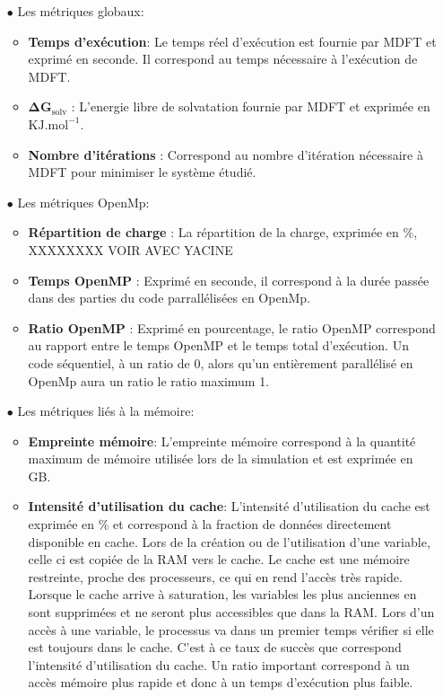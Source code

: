 \begin{itemize}
\item[$\bullet$] Les métriques globaux:
  \begin{itemize}
    \item \textbf{Temps d’exécution}: Le temps réel d'exécution est fournie par MDFT et exprimé en seconde. Il correspond au temps nécessaire à l'exécution de MDFT.
    \item $\mathbf{\Delta G_{\mathrm{solv}}}$ : L'energie libre de solvatation fournie par MDFT et exprimée en $\mathrm{KJ.mol}^{-1}$.
    \item \textbf{Nombre d'itérations} : Correspond au nombre d'itération nécessaire à MDFT pour minimiser le système étudié.
  \end{itemize}
  \vspace*{1.5ex}%

\item[$\bullet$] Les métriques OpenMp:
  \begin{itemize}
  \item \textbf{Répartition de charge} : La répartition de la charge, exprimée en \%, XXXXXXXX VOIR AVEC YACINE
  \item \textbf{Temps OpenMP} : Exprimé en seconde, il correspond à la durée passée dans des parties du code parrallélisées en OpenMp.
  \item \textbf{Ratio OpenMP} : Exprimé en pourcentage, le ratio OpenMP correspond au rapport entre le temps OpenMP et le temps total d'exécution. Un code séquentiel, à un ratio de 0, alors qu'un entièrement parallélisé en OpenMp aura un ratio le ratio maximum 1. 
  \end{itemize}
  \vspace*{1.5ex}%

\item[$\bullet$] Les métriques liés à la mémoire:
  \begin{itemize}
  \item \textbf{Empreinte mémoire}: L'empreinte mémoire correspond à la quantité maximum de mémoire utilisée lors de la simulation et est exprimée en GB.
  \item \textbf{Intensité d'utilisation du cache}: L'intensité d'utilisation du cache est exprimée en \% et correspond à la fraction de données directement disponible en cache. Lors de la création ou de l'utilisation d'une variable, celle ci est copiée de la RAM vers le cache. Le cache est une mémoire restreinte, proche des processeurs, ce qui en rend l'accès très rapide. Lorsque le cache arrive à saturation, les variables les plus anciennes en sont supprimées et ne seront plus accessibles que dans la RAM. Lors d'un accès à une variable, le processus va dans un premier temps vérifier si elle est toujours dans le cache. C'est à ce taux de succès que correspond l'intensité d'utilisation du cache. Un ratio important correspond à un accès mémoire plus rapide et donc à un temps d'exécution plus faible.
  \end{itemize}
  \vspace*{1.5ex}%


\end{itemize}
